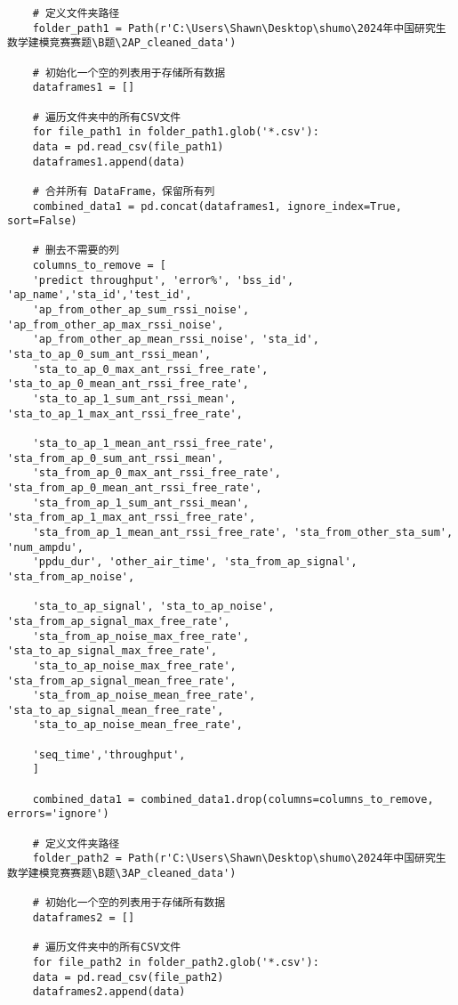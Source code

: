 \documentclass[bwprint,fontset=windows]{gmcmthesis}
\begin{document}
\begin{lstlisting}

	
	
	# 定义文件夹路径
	folder_path1 = Path(r'C:\Users\Shawn\Desktop\shumo\2024年中国研究生数学建模竞赛赛题\B题\2AP_cleaned_data')
	
	# 初始化一个空的列表用于存储所有数据
	dataframes1 = []
	
	# 遍历文件夹中的所有CSV文件
	for file_path1 in folder_path1.glob('*.csv'):
	data = pd.read_csv(file_path1)
	dataframes1.append(data)
	
	# 合并所有 DataFrame，保留所有列
	combined_data1 = pd.concat(dataframes1, ignore_index=True, sort=False)
	
	# 删去不需要的列
	columns_to_remove = [
	'predict throughput', 'error%', 'bss_id', 'ap_name','sta_id','test_id',
	'ap_from_other_ap_sum_rssi_noise', 'ap_from_other_ap_max_rssi_noise',
	'ap_from_other_ap_mean_rssi_noise', 'sta_id', 'sta_to_ap_0_sum_ant_rssi_mean',
	'sta_to_ap_0_max_ant_rssi_free_rate', 'sta_to_ap_0_mean_ant_rssi_free_rate',
	'sta_to_ap_1_sum_ant_rssi_mean', 'sta_to_ap_1_max_ant_rssi_free_rate',
	
	'sta_to_ap_1_mean_ant_rssi_free_rate', 'sta_from_ap_0_sum_ant_rssi_mean',
	'sta_from_ap_0_max_ant_rssi_free_rate', 'sta_from_ap_0_mean_ant_rssi_free_rate',
	'sta_from_ap_1_sum_ant_rssi_mean', 'sta_from_ap_1_max_ant_rssi_free_rate',
	'sta_from_ap_1_mean_ant_rssi_free_rate', 'sta_from_other_sta_sum', 'num_ampdu',
	'ppdu_dur', 'other_air_time', 'sta_from_ap_signal', 'sta_from_ap_noise',
	
	'sta_to_ap_signal', 'sta_to_ap_noise', 'sta_from_ap_signal_max_free_rate',
	'sta_from_ap_noise_max_free_rate', 'sta_to_ap_signal_max_free_rate',
	'sta_to_ap_noise_max_free_rate', 'sta_from_ap_signal_mean_free_rate',
	'sta_from_ap_noise_mean_free_rate', 'sta_to_ap_signal_mean_free_rate',
	'sta_to_ap_noise_mean_free_rate',
	
	'seq_time','throughput',
	]
	
	combined_data1 = combined_data1.drop(columns=columns_to_remove, errors='ignore')
	
	# 定义文件夹路径
	folder_path2 = Path(r'C:\Users\Shawn\Desktop\shumo\2024年中国研究生数学建模竞赛赛题\B题\3AP_cleaned_data')
	
	# 初始化一个空的列表用于存储所有数据
	dataframes2 = []
	
	# 遍历文件夹中的所有CSV文件
	for file_path2 in folder_path2.glob('*.csv'):
	data = pd.read_csv(file_path2)
	dataframes2.append(data)
	

\end{lstlisting}
\end{document}

